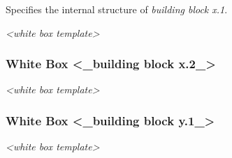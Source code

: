 Specifies the internal structure of \emph{building block x.1}.

\emph{\textless white box template\textgreater{}}

\hypertarget{_white_box_building_block_x_2}{%
\subsubsection{White Box \textless\_building block
x.2\_\textgreater{}}\label{_white_box_building_block_x_2}}

\emph{\textless white box template\textgreater{}}

\hypertarget{_white_box_building_block_y_1}{%
\subsubsection{White Box \textless\_building block
y.1\_\textgreater{}}\label{_white_box_building_block_y_1}}

\emph{\textless white box template\textgreater{}}
